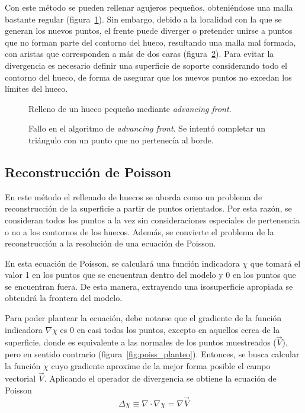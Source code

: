 		Con este método se pueden rellenar agujeros pequeños, obteniéndose una malla bastante regular (figura~\ref{fig:fill_good}).
		Sin embargo, debido a la localidad con la que se generan los nuevos
		puntos, el frente puede diverger o pretender unirse a puntos que no
		forman parte del contorno del hueco, resultando una malla mal formada,
		con aristas que corresponden a más de dos caras (figura~\ref{fig:fill_bad}).
		Para evitar la divergencia es necesario definir una superficie de
		soporte considerando todo el contorno del hueco, de forma de asegurar
		que los nuevos puntos no excedan los límites del hueco.

	\begin{figure}
		\caption{\label{fig:fill_good}Relleno de un hueco pequeño mediante \emph{advancing front}.}
	\end{figure}

	\begin{figure}
		\caption{\label{fig:fill_bad}Fallo en el algoritmo de \emph{advancing front}. Se intentó completar un triángulo con un punto que no pertenecía al borde.}
	\end{figure}

	\subsection{Reconstrucción de Poisson}
	En este método el rellenado de huecos se aborda como un problema de
	reconstrucción de la superficie a partir de puntos orientados.  Por esta
	razón, se consideran todos los puntos a la vez sin consideraciones
	especiales de pertenencia o no a los contornos de los huecos.
	Además, se convierte el problema de la reconstrucción a la resolución de
	una ecuación de Poisson.

	En esta ecuación de Poisson, se calculará una función indicadora $\chi$
	que tomará el valor 1 en los puntos que se encuentran dentro del modelo
	y 0 en los puntos que se encuentran fuera.
	De esta manera, extrayendo una isosuperficie apropiada se obtendrá la frontera del modelo.

	Para poder plantear la ecuación, debe notarse que el gradiente de la función indicadora $\nabla \chi$
	es 0 en casi todos los puntos, excepto en aquellos cerca de la superficie,
	donde es equivalente a las normales de los puntos muestreados ($\vec{V}$), pero en sentido contrario (figura~\ref{fig:poiss_planteo}).
	Entonces, se busca calcular la función $\chi$ cuyo gradiente aproxime de la mejor forma posible el
	campo vectorial $\vec{V}$.
	Aplicando  el operador de divergencia se obtiene la ecuación de Poisson
	\[ \Delta\chi \equiv \nabla \cdot \nabla \chi = \nabla\vec{V} \]

